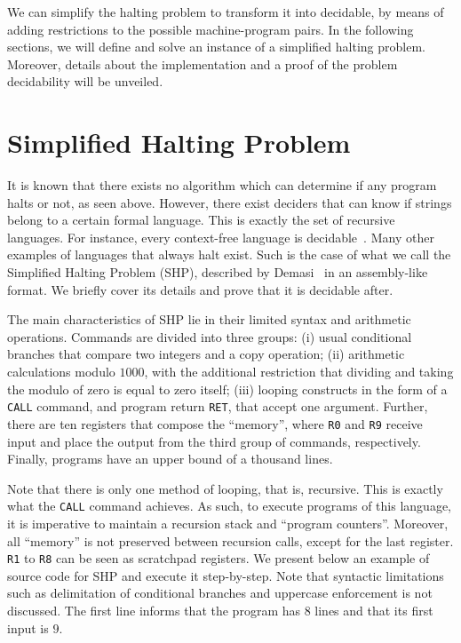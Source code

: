\documentclass[12pt]{article}
\begin{document}
We can simplify the halting problem to transform it into decidable, by means of adding restrictions to the possible machine-program pairs. In the following sections, we will define and solve an instance of a simplified halting problem. Moreover, details about the implementation and a proof of the problem decidability will be unveiled.

\section{Simplified Halting Problem}\label{sec:halting}

It is known that there exists no algorithm which can determine if any program halts or not, as seen above. However, there exist deciders that can know if strings belong to a certain formal language. This is exactly the set of recursive languages. For instance, every context-free language is decidable~\cite[Theorem 4.9]{Sipser:book:2012}. Many other examples of languages that always halt exist. Such is the case of what we call the Simplified Halting Problem (SHP), described by Demasi~\cite{Demasi:misc:2013:may} in an assembly-like format. We briefly cover its details and prove that it is decidable after.

The main characteristics of SHP lie in their limited syntax and arithmetic operations. Commands are divided into three groups: (i) usual conditional branches that compare two integers and a copy operation; (ii) arithmetic calculations modulo $1000$, with the additional restriction that dividing and taking the modulo of zero is equal to zero itself; (iii) looping constructs in the form of a \texttt{CALL} command, and program return \texttt{RET}, that accept one argument. Further, there are ten registers that compose the ``memory'', where \texttt{R0} and \texttt{R9} receive input and place the output from the third group of commands, respectively. Finally, programs have an upper bound of a thousand lines.

Note that there is only one method of looping, that is, recursive. This is exactly what the \texttt{CALL} command achieves. As such, to execute programs of this language, it is imperative to maintain a recursion stack and ``program counters''. Moreover, all ``memory'' is not preserved between recursion calls, except for the last register. \texttt{R1} to \texttt{R8} can be seen as scratchpad registers. We present below an example of source code for SHP and execute it step-by-step. Note that syntactic limitations such as delimitation of conditional branches and uppercase enforcement is not discussed. The first line informs that the program has $8$ lines and that its first input is $9$.
\end{document}
